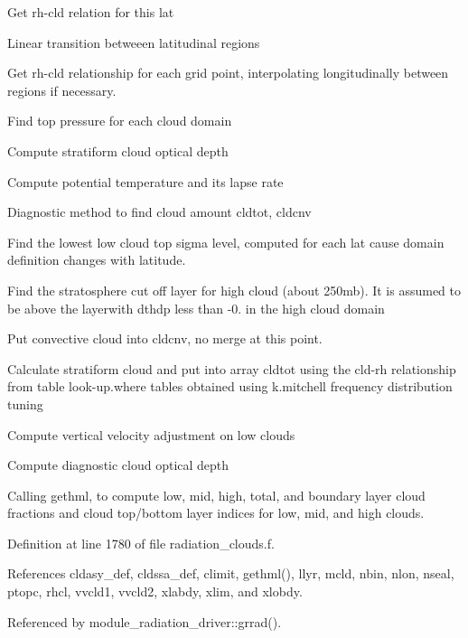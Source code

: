 \begin{DoxyEnumerate}
\item Get rh-\/cld relation for this lat
\item Linear transition betweeen latitudinal regions
\item Get rh-\/cld relationship for each grid point, interpolating longitudinally between regions if necessary.
\item Find top pressure for each cloud domain
\item Compute stratiform cloud optical depth
\item Compute potential temperature and its lapse rate
\item Diagnostic method to find cloud amount cldtot, cldcnv
\begin{DoxyItemize}
\item Find the lowest low cloud top sigma level, computed for each lat cause domain definition changes with latitude.
\item Find the stratosphere cut off layer for high cloud (about 250mb). It is assumed to be above the layerwith dthdp less than -\/0. in the high cloud domain
\item Put convective cloud into \textquotesingle{}cldcnv\textquotesingle{}, no merge at this point.
\item Calculate stratiform cloud and put into array \textquotesingle{}cldtot\textquotesingle{} using the cld-\/rh relationship from table look-\/up.\+where tables obtained using k.\+mitchell frequency distribution tuning
\item Compute vertical velocity adjustment on low clouds
\item Compute diagnostic cloud optical depth
\end{DoxyItemize}
\item Calling gethml, to compute low, mid, high, total, and boundary layer cloud fractions and cloud top/bottom layer indices for low, mid, and high clouds. 
\end{DoxyEnumerate}

Definition at line 1780 of file radiation\+\_\+clouds.\+f.



References cldasy\+\_\+def, cldssa\+\_\+def, climit, gethml(), llyr, mcld, nbin, nlon, nseal, ptopc, rhcl, vvcld1, vvcld2, xlabdy, xlim, and xlobdy.



Referenced by module\+\_\+radiation\+\_\+driver\+::grrad().



